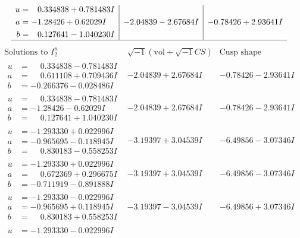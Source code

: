 \documentclass[1p]{elsarticle_modified}
\theoremstyle{definition}
\newcommand{\I}{\sqrt{-1}}
\begin{document}
$$\begin{array}{c|c|c}
\begin{aligned}
u &= \phantom{-}0.334838 + 0.781483 I \\
a &= -1.28426 + 0.62029 I \\
b &= \phantom{-}0.127641 - 1.040230 I\end{aligned}
 & -2.04839 - 2.67684 I & -0.78426 + 2.93641 I\\
 \hline 
 \end{array}$$\newpage$$\begin{array}{c|c|c}  
\text{Solutions to }I^u_{2}& \I (\text{vol} + \sqrt{-1}CS) & \text{Cusp shape}\\
 \hline 
\begin{aligned}
u &= \phantom{-}0.334838 - 0.781483 I \\
a &= \phantom{-}0.611108 + 0.709436 I \\
b &= -0.266376 - 0.028486 I\end{aligned}
 & -2.04839 + 2.67684 I & -0.78426 - 2.93641 I \\ \hline\begin{aligned}
u &= \phantom{-}0.334838 - 0.781483 I \\
a &= -1.28426 - 0.62029 I \\
b &= \phantom{-}0.127641 + 1.040230 I\end{aligned}
 & -2.04839 + 2.67684 I & -0.78426 - 2.93641 I \\ \hline\begin{aligned}
u &= -1.293330 + 0.022996 I \\
a &= -0.965695 - 0.118945 I \\
b &= \phantom{-}0.830183 - 0.558253 I\end{aligned}
 & -3.19397 + 3.04539 I & -6.49856 - 3.07346 I \\ \hline\begin{aligned}
u &= -1.293330 + 0.022996 I \\
a &= \phantom{-}0.672369 + 0.296675 I \\
b &= -0.711919 - 0.891888 I\end{aligned}
 & -3.19397 + 3.04539 I & -6.49856 - 3.07346 I \\ \hline\begin{aligned}
u &= -1.293330 - 0.022996 I \\
a &= -0.965695 + 0.118945 I \\
b &= \phantom{-}0.830183 + 0.558253 I\end{aligned}
 & -3.19397 - 3.04539 I & -6.49856 + 3.07346 I \\ \hline\begin{aligned}
u &= -1.293330 - 0.022996 I \\

\end{aligned}
\end{array}$$
\end{document}
